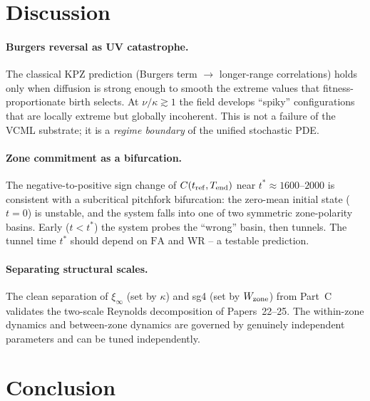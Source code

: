 \documentclass[11pt,a4paper]{article}
\begin{document}
\section{Discussion}

\paragraph{Burgers reversal as UV catastrophe.}
The classical KPZ prediction (Burgers term $\to$ longer-range correlations)
holds only when diffusion is strong enough to smooth the extreme values that
fitness-proportionate birth selects.  At $\nu/\kappa \gtrsim 1$ the
field develops ``spiky'' configurations that are locally extreme but globally
incoherent.  This is not a failure of the VCML substrate; it is a
\emph{regime boundary} of the unified stochastic PDE.

\paragraph{Zone commitment as a bifurcation.}
The negative-to-positive sign change of $C(t_{\rm ref}, T_{\rm end})$ near
$t^* \approx 1600$--$2000$ is consistent with a subcritical pitchfork
bifurcation: the zero-mean initial state ($t=0$) is unstable, and the system
falls into one of two symmetric zone-polarity basins.  Early ($t < t^*$) the
system probes the ``wrong'' basin, then tunnels.  The tunnel time $t^*$ should
depend on $\mathrm{FA}$ and $\mathrm{WR}$ -- a testable prediction.

\paragraph{Separating structural scales.}
The clean separation of $\xi_\infty$ (set by $\kappa$) and sg4 (set by
$W_{\rm zone}$) from Part~C validates the two-scale Reynolds decomposition of
Papers~22--25.  The within-zone dynamics and between-zone dynamics are governed
by genuinely independent parameters and can be tuned independently.

\section{Conclusion}
\end{document}
